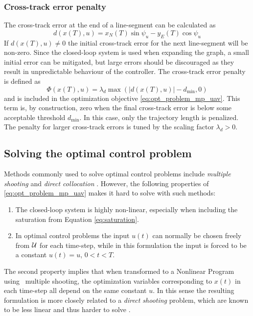 \subsubsection{Cross-track error penalty}
The cross-track error at the end of a line-segment can be calculated as 
\begin{equation}
    d(x(T), u) = x_{N}(T)\sin\psi_u-y_{E}(T)\cos\psi_u
\end{equation}
If $d(x(T), u)\neq0$ the initial cross-track error for the next line-segment will be non-zero. 
Since the closed-loop system is used when expanding the graph, a small initial error can be mitigated, but large errors should be discouraged as they result in unpredictable behaviour of the controller.
The cross-track error penalty is defined as
\begin{equation}\label{eq:phi_d}
    \Phi(x(T), u)=\lambda_d\max(|d(x(T), u)|-d_{\text{min}},0)
\end{equation}
and is included in the optimization objective \eqref{eq:opt_problem_mp_uav}. 
This term is, by construction, zero when the final cross-track error is below some acceptable threshold $d_{\text{min}}$. In this case, only the trajectory length is penalized. 
The penalty for larger cross-track errors is tuned by the scaling factor $\lambda_d>0$.

\subsection{Solving the optimal control problem}\label{sec:solve_opt_ctrl}
Methods commonly used to solve optimal control problems include \textit{multiple shooting} 
and \textit{direct collocation} \cite{multiple_shooting}. 
However, the following properties of \eqref{eq:opt_problem_mp_uav} makes it hard to solve with such methods:
\begin{enumerate}
    \item The closed-loop system is highly non-linear, especially when including the saturation from Equation \eqref{eq:saturation}.
    \item In optimal control problems the input $u(t)$ can normally be chosen freely from $\mathcal{U}$ for each time-step, while 
    in this formulation the input is forced to be a constant $u(t)=u$, $0<t<T$.
\end{enumerate}
The second property implies that when transformed to a Nonlinear Program using \eg\ multiple shooting,
the optimization variables corresponding to $x(t)$ in each time-step all depend on the same constant $u$. In this sense the resulting formulation is 
more closely related to a \textit{direct shooting} problem, which are known to be less linear and thus harder to solve \cite{multiple_shooting}.


